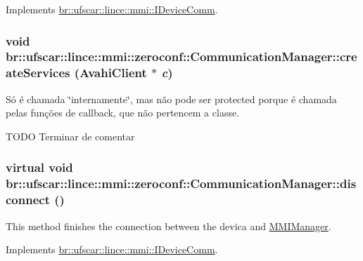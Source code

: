 Implements \hyperlink{classbr_1_1ufscar_1_1lince_1_1mmi_1_1IDeviceComm_a53f48993f294b9a755125b6ccdb06ad4}{br::ufscar::lince::mmi::IDeviceComm}.

\hypertarget{classbr_1_1ufscar_1_1lince_1_1mmi_1_1zeroconf_1_1CommunicationManager_a9255db8e4fc96b6cd99b3ba67c4e79e5}{
\subsubsection[{createServices}]{\setlength{\rightskip}{0pt plus 5cm}void br::ufscar::lince::mmi::zeroconf::CommunicationManager::createServices (AvahiClient $\ast$ {\em c})}}
\label{classbr_1_1ufscar_1_1lince_1_1mmi_1_1zeroconf_1_1CommunicationManager_a9255db8e4fc96b6cd99b3ba67c4e79e5}


Só é chamada \char`\"{}internamente\char`\"{}, mas não pode ser protected porque é chamada pelas funções de callback, que não pertencem a classe. 

TODO Terminar de comentar \hypertarget{classbr_1_1ufscar_1_1lince_1_1mmi_1_1zeroconf_1_1CommunicationManager_a1c41c5541bf5c02b78f3dc10a045c7f6}{
\subsubsection[{disconnect}]{\setlength{\rightskip}{0pt plus 5cm}virtual void br::ufscar::lince::mmi::zeroconf::CommunicationManager::disconnect ()}}
\label{classbr_1_1ufscar_1_1lince_1_1mmi_1_1zeroconf_1_1CommunicationManager_a1c41c5541bf5c02b78f3dc10a045c7f6}


This method finishes the connection between the devica and \hyperlink{classbr_1_1ufscar_1_1lince_1_1mmi_1_1MMIManager}{MMIManager}. 



Implements \hyperlink{classbr_1_1ufscar_1_1lince_1_1mmi_1_1IDeviceComm_ad3791cf1ab234f4a6b464c3f614c78c6}{br::ufscar::lince::mmi::IDeviceComm}.

